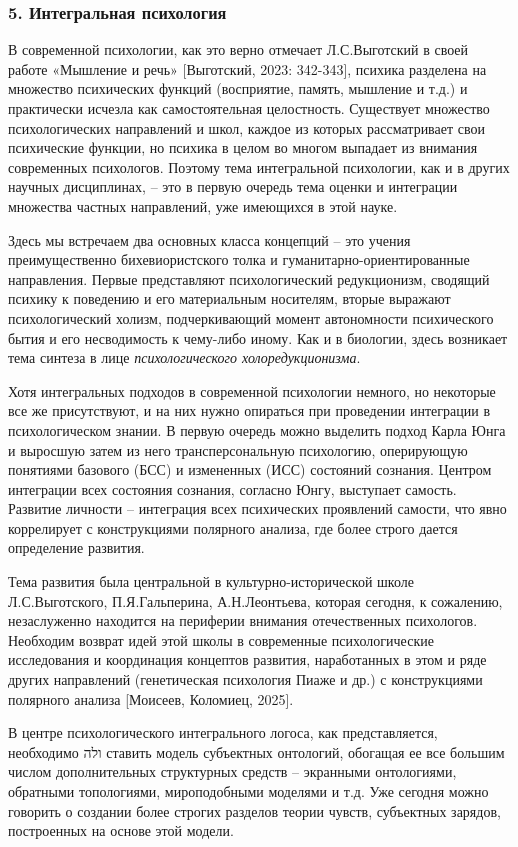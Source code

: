     \subsubsection*{5. Интегральная психология}
    В современной психологии, как это верно отмечает Л.С.Выготский в своей работе «Мышление и речь» [Выготский, 2023: 342-343], психика разделена на множество психических функций (восприятие, память, мышление и т.д.) и практически исчезла как самостоятельная целостность. Существует множество психологических направлений и школ, каждое из которых рассматривает свои психические функции, но психика в целом во многом выпадает из внимания современных психологов. Поэтому тема интегральной психологии, как и в других научных дисциплинах, – это в первую очередь тема оценки и интеграции множества частных направлений, уже имеющихся в этой науке.

    Здесь мы встречаем два основных класса концепций – это учения преимущественно бихевиористского толка и гуманитарно-ориентированные направления. Первые представляют психологический редукционизм, сводящий психику к поведению и его материальным носителям, вторые выражают психологический холизм, подчеркивающий момент автономности психического бытия и его несводимость к чему-либо иному. Как и в биологии, здесь возникает тема синтеза в лице \textit{психологического холоредукционизма}.

    Хотя интегральных подходов в современной психологии немного, но некоторые все же присутствуют, и на них нужно опираться при проведении интеграции в психологическом знании. В первую очередь можно выделить подход Карла Юнга и выросшую затем из него трансперсональную психологию, оперирующую понятиями базового (БСС) и измененных (ИСС) состояний сознания. Центром интеграции всех состояния сознания, согласно Юнгу, выступает самость. Развитие личности – интеграция всех психических проявлений самости, что явно коррелирует с конструкциями полярного анализа, где более строго дается определение развития.

    Тема развития была центральной в культурно-исторической школе Л.С.Выготского, П.Я.Гальперина, А.Н.Леонтьева, которая сегодня, к сожалению, незаслуженно находится на периферии внимания отечественных психологов. Необходим возврат идей этой школы в современные психологические исследования и координация концептов развития, наработанных в этом и ряде других направлений (генетическая психология Пиаже и др.) с конструкциями полярного анализа [Моисеев, Коломиец, 2025].

    В центре психологического интегрального логоса, как представляется, необходимо ולה ставить модель субъектных онтологий, обогащая ее все большим числом дополнительных структурных средств – экранными онтологиями, обратными топологиями, мироподобными моделями и т.д. Уже сегодня можно говорить о создании более строгих разделов теории чувств, субъектных зарядов, построенных на основе этой модели.

